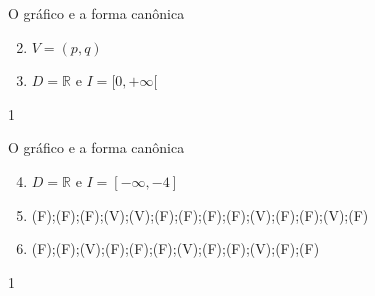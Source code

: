 \clearmargin
\clearmargin
\marginpar{\vspace{.5em}}
\begin{answer}{O gráfico e a forma canônica}
{
\begin{enumerate}\setcounter{enumi}{1}
\item {} 
\(V=(p,q)\)

\item {} 
\(D=\mathbb{R}\) e \(I=[0,+\infty[\)
\end{enumerate}
}{1}
\end{answer}
\clearmargin
\marginpar{\vspace{.5em}}
\begin{answer}{O gráfico e a forma canônica}
{
\begin{enumerate}\setcounter{enumi}{3}
\item {} 
\(D=\mathbb{R}\) e \(I=[-\infty,-4]\)

\item {} 
(F);(F);(F);(V);(V);(F);(F);(F);(F);(V);(F);(F);(V);(F)

\item {} 
(F);(F);(V);(F);(F);(F);(V);(F);(F);(V);(F);(F)
\end{enumerate}
}{1}
\end{answer}



